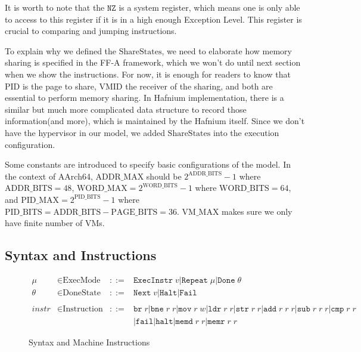 \documentclass[a4paper]{article}
\newcommand*{\derived}{::=}
\newcommand*{\SSS}{\text{ShareStates}}
\newcommand*{\PID}{\text{PID}}
\newcommand*{\VMID}{\text{VMID}}
\newcommand*{\MODE}{\text{ExecMode}}
\newcommand*{\DONE}{\text{DoneState}}
\newcommand*{\INSTR}{\text{Instruction}}
\newcommand*{\PABITS}{\text{ADDR\_BITS}}
\newcommand*{\PPBITS}{\text{PAGE\_BITS}}
\newcommand*{\PPIDBITS}{\text{PID\_BITS}}
\newcommand*{\PAMAX}{\text{ADDR\_MAX}}
\newcommand*{\PPIDMAX}{\text{PID\_MAX}}
\newcommand*{\PWBITS}{\text{WORD\_BITS}}
\newcommand*{\PWMAX}{\text{WORD\_MAX}}
\newcommand*{\PVMMAX}{\text{VM\_MAX}}
\newcommand*{\instrm}[1]{\mathtt{#1}}
\newcommand*{\NXT}[1]{\mathtt{Next} \; {#1}}
\begin{document}
It is worth to note that the $\mathtt{NZ}$ is a system register, which means one
is only able to access to this register if it is in a high enough Exception Level. This register
is crucial to comparing and jumping instructions.

To explain why we defined the $\SSS$, we need to elaborate how memory sharing is
specified in the FF-A framework, which we won't do until next section when we
show the instructions. For now, it is enough for readers to know that $\PID$ is
the page to share, $\VMID$ the receiver of the sharing, and both are essential
to perform memory sharing. In Hafnium implementation, there is a similar but
much more complicated data structure to record those information(and more),
which is maintained by the Hafnium itself. Since we don't have the hypervisor in
our model, we added $\SSS$ into the execution configuration.

Some constants are introduced to specify basic configurations of the model. In
the context of AArch64, $\PAMAX$ should be $2^{\PABITS} - 1$ where
$\PABITS = 48$, $\PWMAX = 2^{\PWBITS} -1$ where $\PWBITS = 64$, and
$\PPIDMAX = 2^{\PPIDBITS}-1$ where $\PPIDBITS = \PABITS - \PPBITS = 36$.
$\PVMMAX$ makes sure we only have finite number of VMs.





\subsection{Syntax and Instructions}
\begin{figure}[h!]
  \begin{align*}
    \mu &\in \MODE &\derived & \mathtt{ExecInstr} \; v | \mathtt{Repeat} \; \mu | \mathtt{Done} \; \theta \\
    \theta &\in \DONE &\derived & \NXT{v} | \mathtt{Halt} | \mathtt{Fail}\\
    \\
    instr & \in  \INSTR &\derived & \instrm{br} \; r |\instrm{bne} \; r \; r |
                                    \instrm{mov} \; r \; w | \instrm{ldr} \; r\; r|
                                    \instrm{str} \; r \; r | \instrm{add} \; r \; r \; r |
                                    \instrm{sub} \; r \; r \; r | \instrm{cmp} \; r \; r \\
        & & & | \instrm{fail} | \instrm{halt} | \instrm{memd} \; r \; r | \instrm{memr} \; r\; r
  \end{align*}
  \caption{Syntax and Machine Instructions}
\end{figure}
\end{document}
